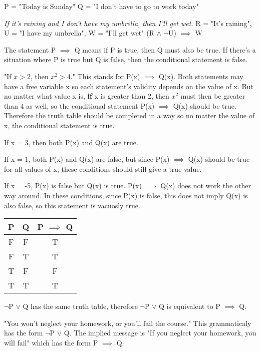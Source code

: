 \documentclass[11pt]{article}
\theoremstyle{definition}
\theoremstyle{remark}
\begin{document}
\begin{center}
    P = "Today is Sunday" Q = "I don't have to go to work today"
\end{center}

\textit{If it's raining and I don't have my umbrella, then I'll get wet.} \newline
R = "It's raining", U = "I have my umbrella", W = "I'll get wet" \newline
(R $\land$ $\neg$U) $\implies$ W

The statement P $\implies$ Q means if P is true, then Q must also be true. If there's a situation where P is true
but Q is false, then the conditional statement is false.

"If $x>2$, then $x^2 > 4$." This stands for P(x) $\implies$ Q(x). Both statements may have a free variable x so each
statement's validity depends on the value of x. But no matter what value x is, \textbf{if} x is greater than 2, then
$x^2$ must then be greater than 4 as well, so the conditional statement P(x) $\implies$ Q(x) should be true. Therefore
the truth table should be completed in a way so no matter the value of x, the conditional statement is true.

If x = 3, then both P(x) and Q(x) are true.

If x = 1, both P(x) and Q(x) are false, but since P(x) $\implies$ Q(x) should be true for all values of x,
these conditions should still give a true value. 

If x = -5, P(x) is false but Q(x) is true. P(x) $\implies$ Q(x) does not work the other way around. In these
conditions, since P(x) is false, this does not imply Q(x) is also false, so this statement is
vacuosly true. 

\begin{center}
\begin{tabular}{c c|c}
            P & Q &  P $\implies$ Q \\
        \hline
            F & F &  T \\
            F & T &  T \\
            T & F &  F \\
            T & T &  T \\
\end{tabular}
\end{center}

$\neg$P $\lor$ Q has the same truth table, therefore $\neg$P $\lor$ Q is equivalent to P $\implies$ Q. 

"You won't neglect your homework, or you'll fail the course." This grammaticaly has the form
$\neg$P $\lor$ Q. The implied message is "If you neglect your homework, you will fail" which has the form
P $\implies$ Q.
\end{document}
